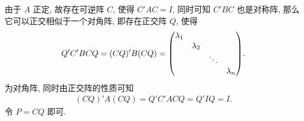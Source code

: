 \begin{exercise}[series=exer]
\begin{hint}
\begin{hintsheet}
        \end{hintsheet}
    \end{hint}
    \begin{answer}
        \begin{answersheet}
            \item 由于 $ A $ 正定, 故存在可逆阵 $ C $, 使得 $ C'AC = I $, 同时可知 $ C'BC $ 也是对称阵, 那么它可以正交相似于一个对角阵, 即存在正交阵 $ Q $, 使得
            \begin{align*}
                Q'C'BCQ = (CQ)'B(CQ) = \mqty(\dmat{\lambda_{1}, \lambda_{2}, \ddots, \lambda_{n}}).
            \end{align*}
            为对角阵, 同时由正交阵的性质可知
            \begin{align*}
                (CQ)'A(CQ) = Q'C'ACQ = Q'IQ = I.
            \end{align*}
            令 $ P = CQ $ 即可. 
            

\end{answersheet}
\end{answer}
\end{exercise}
